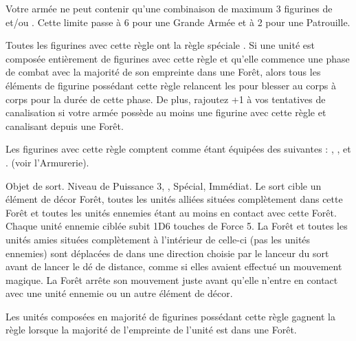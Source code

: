 \armyspecialruleentry{\theforestfollows}

Votre armée ne peut contenir qu'une combinaison de maximum 3 figurines de \treefathers{} et/ou \treefatherancients{}. Cette limite passe à 6 pour une Grande Armée et à 2 pour une Patrouille.

\closearmywiderules

\vspace*{1.5cm}
\startarmyspecialrules

\armyspecialruleentry{\forestwalker}

Toutes les figurines avec cette règle ont la règle spéciale \strider{\forest}. Si une unité est composée entièrement de figurines avec cette règle et qu'elle commence une phase de combat avec la majorité de son empreinte dans une Forêt, alors tous les éléments de figurine possédant cette règle relancent les  pour blesser au corps à corps pour la durée de cette phase. De plus, rajoutez +1 à vos tentatives de canalisation si votre armée possède au moins une figurine avec cette règle et canalisant depuis une Forêt. 

\armyspecialruleentry{\masterarchers}

Les figurines avec cette règle comptent comme étant équipées des \feyarrows{} suivantes : \truemarkarrows{}, \starlightshaft{}, \perforatingtip et \jewelweedshot. (voir l'Armurerie).

\armyspecialruleentry{\treesinging}

Objet de sort. Niveau de Puissance 3, , Spécial, Immédiat. Le sort cible un élément de décor Forêt, toutes les unités alliées situées complètement dans cette Forêt et toutes les unités ennemies étant au moins en contact avec cette Forêt. Chaque unité ennemie ciblée subit 1D6 touches de Force 5. La Forêt et toutes les unités amies situées complètement à l'intérieur de celle-ci (pas les unités ennemies) sont déplacées de  dans une direction choisie par le lanceur du sort avant de lancer le dé de distance, comme si elles avaient effectué un mouvement magique. La Forêt arrête son mouvement juste avant qu'elle n'entre en contact avec une unité ennemie ou un autre élément de décor.

\armyspecialruleentry{\emboldeningboughs}

Les unités composées en majorité de figurines possédant cette règle gagnent la règle \stubborn{} lorsque la majorité de l'empreinte de l'unité est dans une Forêt.

\closearmyspecialrules


